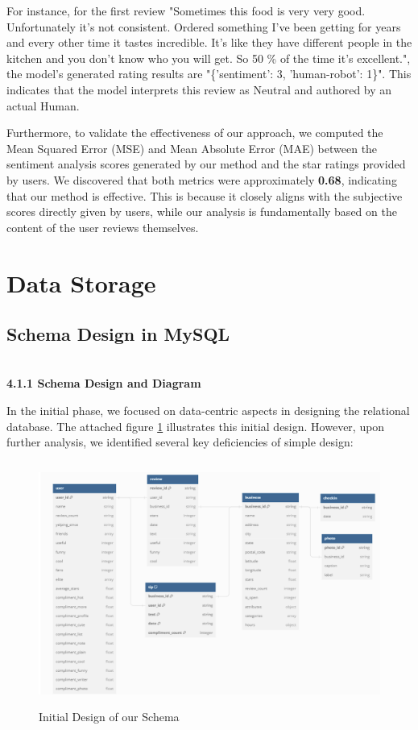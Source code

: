 \documentclass[runningheads]{llncs}
\begin{document}
For instance, for the first review "Sometimes this food is very very good. Unfortunately it's not consistent. Ordered something I've been getting for years and every other time it tastes incredible. It's like they have different people in the kitchen and you don't know who you will get. So 50 \% of the time it's excellent.", the model's generated rating results are "\{'sentiment': 3, 'human-robot': 1\}". This indicates that the model interprets this review as Neutral and authored by an actual Human.

Furthermore, to validate the effectiveness of our approach, we computed the Mean Squared Error (MSE) and Mean Absolute Error (MAE) between the sentiment analysis scores generated by our method and the star ratings provided by users. We discovered that both metrics were approximately \textbf{0.68}, indicating that our method is effective. This is because it closely aligns with the subjective scores directly given by users, while our analysis is fundamentally based on the content of the user reviews themselves.




\section{Data Storage}


\subsection{Schema Design in MySQL}

\textbf{\\4.1.1 Schema Design and Diagram\\}

In the initial phase, we focused on data-centric aspects in designing the relational database. The attached figure \ref{fig:sch1} illustrates this initial design. However, upon further analysis, we identified several key deficiencies of simple design:

\begin{figure}[!h]
\centering
\includegraphics[height=8cm]{figs/schema_1.png}
\caption{Initial Design of our Schema}
\label{fig:sch1}
\end{figure}
\end{document}
